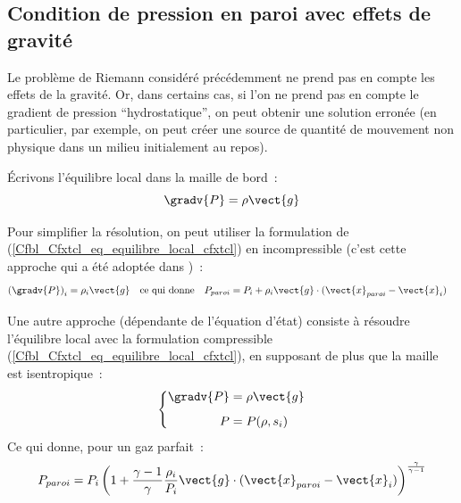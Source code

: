 \subsection*{Condition de pression en paroi avec effets de gravité}

Le problème de Riemann considéré précédemment
ne prend pas en compte les effets de la gravité.
Or, dans certains cas, si l'on ne prend pas en compte le gradient de
pression ``hydrostatique'',  on peut obtenir une solution erronée
(en particulier, par exemple,
on peut créer une source de quantité de mouvement
non physique dans un milieu initialement au repos).

Écrivons l'équilibre local dans la maille de bord~:
\begin{equation}\label{Cfbl_Cfxtcl_eq_equilibre_local_cfxtcl}
\gradv{P} = \rho \vect{g}
\end{equation}

Pour simplifier la résolution, on peut utiliser la formulation
de (\ref{Cfbl_Cfxtcl_eq_equilibre_local_cfxtcl}) en incompressible
(c'est cette approche qui a été adoptée dans \CS)~:
\begin{equation}\label{Cfbl_Cfxtcl_eq_equilibre_incompressible_cfxtcl}
\begin{aligned}
\left(\gradv{P}\right)_i &= \rho_i \vect{g}
&\text{ce qui donne}\quad&
P_{paroi} = P_i + \rho_i \vect{g} \cdot (\vect{x}_{paroi} - \vect{x}_i)
\end{aligned}
\end{equation}


Une autre approche (dépendante de l'équation d'état)
consiste à résoudre l'équilibre local avec la formulation
compressible (\ref{Cfbl_Cfxtcl_eq_equilibre_local_cfxtcl}), en supposant de plus que
la maille est isentropique~:
\begin{equation}
\left\{
\begin{aligned}
\gradv{P} &= \rho \vect{g}\\[0.5em]
P &= P(\rho,s_i)
\end{aligned}
\right.
\end{equation}
Ce qui donne, pour un gaz parfait~:
\begin{equation}
\label{Cfbl_Cfxtcl_eq_equilibre_compressible_cfxtcl}
 P_{paroi} = P_i \left( 1+ \displaystyle\frac{\gamma -1}{\gamma}
\displaystyle\frac{\rho_i}{P_i} \vect{g} \cdot (\vect{x}_{paroi} - \vect{x}_i)
\right)^{\frac{\gamma}{\gamma -1}}
\end{equation}

